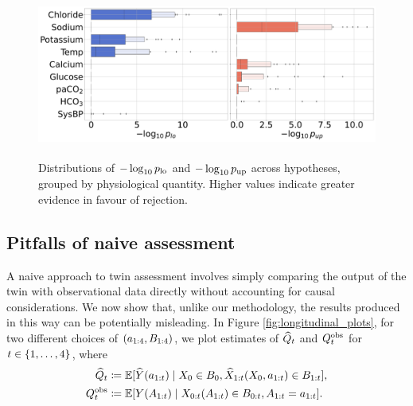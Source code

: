 %
%
%
%
%
%
%
%
%
%
%

%
%

\begin{figure}%
    \centering
    \includegraphics[height=5.5cm]{figures/causal/latest_experimental_results/p_values_nogray.pdf}
    \caption{Distributions of $-\log_{10}{p_\textup{lo}}$ and $-\log_{10}{p_\textup{up}}$ across hypotheses, grouped by physiological quantity. Higher values indicate greater evidence in favour of rejection.}
    \label{fig:p_values}
\end{figure}



\subsection{Pitfalls of naive assessment}

A naive approach to twin assessment involves simply comparing the output of the twin with observational data directly without accounting for causal considerations.
We now show that, unlike our methodology, the results produced in this way can be potentially misleading.
%
In Figure \ref{fig:longitudinal_plots}, for two different choices of $(a_{1:4}, B_{1:4})$, we plot estimates of $\widehat{Q}_t$ and $Q^{\textup{obs}}_t$ for $t \in \{1, \ldots, 4\}$, where
%
\begin{align*}
    \widehat{Q}_t &\coloneqq \mathbb{E}[\widehat{Y}(a_{1:t})\mid X_0 \in B_0, \widehat{X}_{1:t}(X_0, a_{1:t}) \in B_{1:t}],\\
    Q^{\textup{obs}}_t &\coloneqq \mathbb{E}[Y(A_{1:t})\mid X_{0:t}(A_{1:t})\in B_{0:t}, A_{1:t}=a_{1:t}]. \notag
\end{align*}


